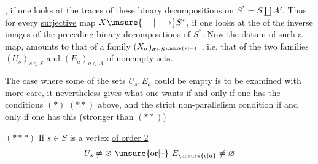 , if one looks at the traces of these binary decompositions on $S^\ast=S\amalg A'$. Thus for every \uline{surjective} map $X\unsure{\mathrel{\text{---}}|\longrightarrow}S^\ast$, if one looks at the of the inverse images of the preceding binary decompositions of $S^\ast$. Now the datum of such a map, amounts to that of a family $(X_\sigma)_{\sigma\in S^{\unsure{\ast|+}}}$ , i.e.  that of the two families $(U_s)_{s\in S}$ and $(E_a)_{a\in A}$ of nonempty sets.

The case where some of the sets $U_s,E_a$ could be empty is to be examined with more care, it nevertheless gives what one wants if and only if one has the conditions $(\ast)$ $(\ast\ast)$ above, and the strict non-parallelism condition if and only if one has \uline{this} (stronger than $(\ast\ast)$)

$(\ast\ast\ast)$ If $s\in S$ is a vertex \uline{of order 2}    
\[
U_s\ne\varnothing\ \unsure{\text{or}|\text{--}}\ E_{\unsure{c|a}}\ne\varnothing
\]
